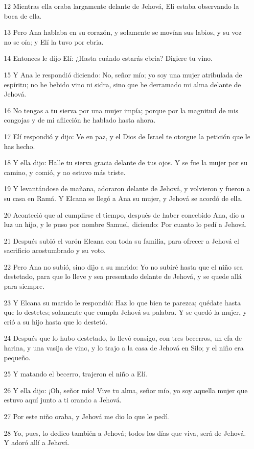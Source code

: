 \par 12 Mientras ella oraba largamente delante de Jehová, Elí estaba observando la boca de ella.
\par 13 Pero Ana hablaba en su corazón, y solamente se movían sus labios, y su voz no se oía; y Elí la tuvo por ebria.
\par 14 Entonces le dijo Elí: ¿Hasta cuándo estarás ebria? Digiere tu vino.
\par 15 Y Ana le respondió diciendo: No, señor mío; yo soy una mujer atribulada de espíritu; no he bebido vino ni sidra, sino que he derramado mi alma delante de Jehová.
\par 16 No tengas a tu sierva por una mujer impía; porque por la magnitud de mis congojas y de mi aflicción he hablado hasta ahora.
\par 17 Elí respondió y dijo: Ve en paz, y el Dios de Israel te otorgue la petición que le has hecho.
\par 18 Y ella dijo: Halle tu sierva gracia delante de tus ojos. Y se fue la mujer por su camino, y comió, y no estuvo más triste.
\par 19 Y levantándose de mañana, adoraron delante de Jehová, y volvieron y fueron a su casa en Ramá. Y Elcana se llegó a Ana su mujer, y Jehová se acordó de ella.
\par 20 Aconteció que al cumplirse el tiempo, después de haber concebido Ana, dio a luz un hijo, y le puso por nombre Samuel, diciendo: Por cuanto lo pedí a Jehová.
\par 21 Después subió el varón Elcana con toda su familia, para ofrecer a Jehová el sacrificio acostumbrado y su voto.
\par 22 Pero Ana no subió, sino dijo a su marido: Yo no subiré hasta que el niño sea destetado, para que lo lleve y sea presentado delante de Jehová, y se quede allá para siempre.
\par 23 Y Elcana su marido le respondió: Haz lo que bien te parezca; quédate hasta que lo destetes; solamente que cumpla Jehová su palabra. Y se quedó la mujer, y crió a su hijo hasta que lo destetó.
\par 24 Después que lo hubo destetado, lo llevó consigo, con tres becerros, un efa   de harina, y una vasija de vino, y lo trajo a la casa de Jehová en Silo; y el niño era pequeño.
\par 25 Y matando el becerro, trajeron el niño a Elí.
\par 26 Y ella dijo: ¡Oh, señor mío! Vive tu alma, señor mío, yo soy aquella mujer que estuvo aquí junto a ti orando a Jehová.
\par 27 Por este niño oraba, y Jehová me dio lo que le pedí.
\par 28 Yo, pues, lo dedico también a Jehová; todos los días que viva, será de Jehová. Y adoró allí a Jehová.

